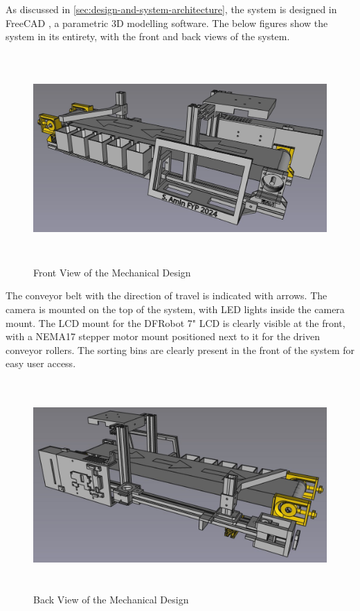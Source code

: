 As discussed in \autoref{sec:design-and-system-architecture}, the system is designed in FreeCAD \cite{freecad}, a parametric 3D modelling software. The below figures show the system in its entirety, with the front and back views of the system.

\begin{figure}[H]
    \begin{minipage}[h]{0.95\textwidth}
        \centering
        \includegraphics[height=8cm]{imgs/freecad/wholefront.jpg}
        \caption{Front View of the Mechanical Design}
    \end{minipage}
\end{figure}

The conveyor belt with the direction of travel is indicated with arrows. The camera is mounted on the top of the system, with LED lights inside the camera mount. The LCD mount for the DFRobot 7" LCD is clearly visible at the front, with a NEMA17 stepper motor mount positioned next to it for the driven conveyor rollers. The sorting bins are clearly present in the front of the system for easy user access.

\begin{figure}[H]
    \begin{minipage}[h]{0.95\textwidth}
        \centering
        \includegraphics[height=8cm]{imgs/freecad/wholeback.jpg}
        \caption{Back View of the Mechanical Design}
    \end{minipage}
\end{figure}

